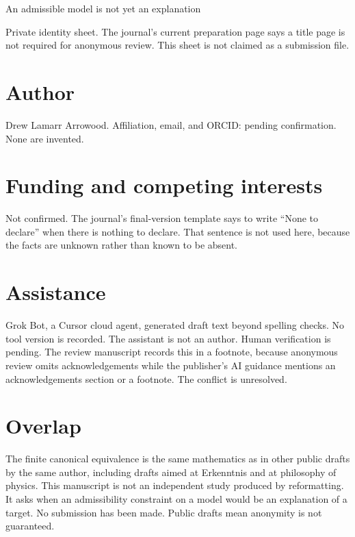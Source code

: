 \documentclass[12pt]{article}
\begin{document}
\begin{center}
{\Large An admissible model is not yet an explanation\par}
\vspace{1em}
Private identity sheet. The journal's current preparation page says a title page is not required for anonymous review. This sheet is not claimed as a submission file.\par
\end{center}
\section*{Author}
Drew Lamarr Arrowood. Affiliation, email, and ORCID: pending confirmation. None are invented.

\section*{Funding and competing interests}
Not confirmed. The journal's final-version template says to write ``None to declare'' when there is nothing to declare. That sentence is not used here, because the facts are unknown rather than known to be absent.

\section*{Assistance}
Grok Bot, a Cursor cloud agent, generated draft text beyond spelling checks. No tool version is recorded. The assistant is not an author. Human verification is pending. The review manuscript records this in a footnote, because anonymous review omits acknowledgements while the publisher's AI guidance mentions an acknowledgements section or a footnote. The conflict is unresolved.

\section*{Overlap}
The finite canonical equivalence is the same mathematics as in other public drafts by the same author, including drafts aimed at Erkenntnis and at philosophy of physics. This manuscript is not an independent study produced by reformatting. It asks when an admissibility constraint on a model would be an explanation of a target. No submission has been made. Public drafts mean anonymity is not guaranteed.
\end{document}
